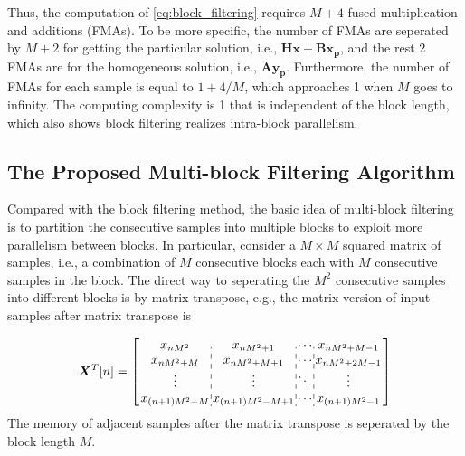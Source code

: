 Thus, the computation of \eqref{eq:block_filtering} requires $M+4$ fused multiplication and additions (FMAs).
To be more specific, the number of FMAs are seperated by $M{+}2$ for getting the particular solution, i.e.,
$\bm{H}\bm{x}+\bm{B}\bm{x_p}$, and the rest 2 FMAs are for the homogeneous solution, i.e., $\bm{Ay_p}$.
Furthermore, the number of FMAs for each sample is equal to $1{+}4/M$, 
which approaches 1 when $M$ goes to infinity.
The computing complexity is 1 that is independent of the block length,
which also shows block filtering realizes intra-block parallelism.


\subsection{The Proposed Multi-block Filtering Algorithm}

Compared with the block filtering method, the basic idea of multi-block filtering is to partition the consecutive samples into multiple blocks to exploit more
parallelism between blocks.
In particular, consider a $M {\times} M$ squared matrix of samples, i.e., a combination of $M$ consecutive blocks each with $M$ consecutive samples in the block.
The direct way to seperating the $M^2$ consecutive samples into different blocks is by matrix transpose,
e.g., the matrix version of input samples after matrix transpose is 

\begin{equation*}
    \begin{aligned}
    \bm{X}^T[n] = \left[
        \arraycolsep=1.0pt\def\arraystretch{1.0}
        \begin{array}{c:c:c:c}
        x_{nM^2} & x_{nM^2+1} & \cdots & x_{nM^2+M-1} \\ 
        x_{nM^2+M} & x_{nM^2+M+1} & \cdots & x_{nM^2+2M-1} \\
        \vdots & \vdots & \ddots & \vdots \\
        x_{(n+1)M^2-M} & x_{(n+1)M^2-M+1} &\cdots & x_{(n+1)M^2-1} \\
        \end{array}\right]
    \end{aligned}
\end{equation*}
The memory of adjacent samples after the matrix transpose is seperated by the block length $M$.

